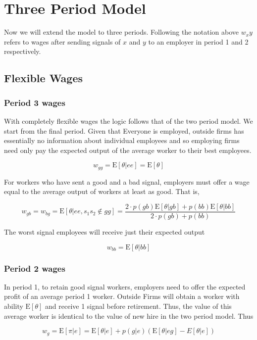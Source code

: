 \documentclass[11pt]{article}
\newcommand{\E}{\mathrm{E}}
\begin{document}
\section{Three Period Model}

Now we will extend the model to three periods. Following the notation above $w_xy$ refers to wages after sending signals of $x$ and $y$ to an employer in period 1 and 2 respectively. 

\subsection{Flexible Wages}

\subsubsection{Period 3 wages }

With completely flexible wages the logic follows that of the two period model. We start from the final period. Given that Everyone is employed, outside firms has essentially no information about individual employees and so employing firms need only pay the expected output of the average worker to their best employees. 

$$ w_{gg} = \E[\theta|ee] = \E[\theta]$$

For workers who have sent a good and a bad signal, employers must offer a wage equal to the average output of workers at least as good. That is, 

$$w_{gb} = w_{bg} = \E[\theta| ee, s_1 s_2 \notin gg] = \frac{2 \cdot p(gb)\E[\theta|gb] + p(bb) \E[\theta|bb]}{2 \cdot p(gb) + p(bb)} $$

The worst signal employees will receive just their expected output 

$$ w_{bb} = \E[\theta|bb]$$

\subsubsection{Period 2 wages }

In period 1, to retain good signal workers, employers need to offer the expected profit of an average period 1 worker. Outside Firms will obtain a worker with ability $\E[\theta]$ and receive 1 signal before retirement. Thus, the value of this average worker is identical to the value of new hire in the two period model. Thus 

$$ w_g = \E[\pi|e] = \E[\theta|e] + p(g|e)(\E[\theta|eg] - E[\theta|e])$$
\end{document}

